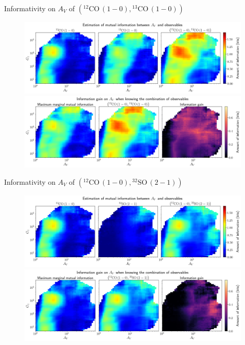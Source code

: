 \documentclass{beamer}
\begin{document}
\begin{frame}{Informativity on $A_V$ of $\left(\mathrm{^{12}CO\,(1-0)},\mathrm{^{13}CO\,(1-0)}\right)$}
    \begin{figure}
        \centering
        \includegraphics[width=0.95\linewidth]{../mi/av__12co10_13co10_mi.png}
        \vfill
        \includegraphics[width=0.95\linewidth]{../mi/av__12co10_13co10_mi_gain.png}
    \end{figure}
\end{frame}

\begin{frame}{Informativity on $A_V$ of $\left(\mathrm{^{12}CO\,(1-0)},\mathrm{^{32}SO\,(2-1)}\right)$}
    \begin{figure}
        \centering
        \includegraphics[width=0.95\linewidth]{../mi/av__12co10_32so21_mi.png}
        \vfill
        \includegraphics[width=0.95\linewidth]{../mi/av__12co10_32so21_mi_gain.png}
    \end{figure}
\end{frame}
\end{document}
